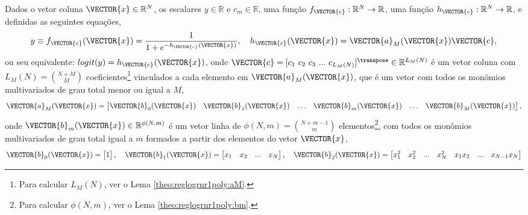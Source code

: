 
\begin{myproofT}\label{proof:theo:reglogrnr1poly}
Dados
o vetor coluna $\VECTOR{x} \in \mathbb{R}^{N}$, os escalares $y \in \mathbb{R}$ e $c_m \in \mathbb{R}$,
uma função $f_{\VECTOR{c}}:\mathbb{R}^{N} \rightarrow \mathbb{R}$, 
uma função $h_{\VECTOR{c}}:\mathbb{R}^{N} \rightarrow \mathbb{R}$,  e 
definidas as seguintes equações,
\begin{equation}\label{eq:proof:theo:reglogrnr1poly:1}
y\equiv f_{\VECTOR{c}}(\VECTOR{x})= \frac{1}{1+e^{-h_{\VECTOR{c}}(\VECTOR{x}) }},
\quad h_{\VECTOR{c}}(\VECTOR{x}) =  \VECTOR{a}_M(\VECTOR{x})\VECTOR{c},
\end{equation}
ou seu equivalente: $logit(y)=h_{\VECTOR{c}}(\VECTOR{x})$,
onde $\VECTOR{c}=[c_1~ c_2~ c_3~  ...~ c_{L_M(N)}]^{\transpose} \in \mathbb{R}^{L_M(N)}$ é um vetor coluna
com $L_M(N)=\binom{N+M}{M}$ coeficientes\footnote{Para calcular $L_M(N)$, ver o Lema \ref{theo:reglogrnr1poly:aM}.} 
vinculados a cada elemento em
$\VECTOR{a}_M(\VECTOR{x})$, que  é um vetor com todos os monômios multivariados de grau total menor ou igual a $M$,
\begin{equation}\label{eq:proof:theo:reglogrnr1poly:2}
\VECTOR{a}_M(\VECTOR{x})=
\begin{bmatrix}
\VECTOR{b}_0(\VECTOR{x}) &
\VECTOR{b}_1(\VECTOR{x}) &
\hdots &
\VECTOR{b}_m(\VECTOR{x}) &
\hdots &
\VECTOR{b}_M(\VECTOR{x}) 
\end{bmatrix},
\end{equation}
onde $\VECTOR{b}_m(\VECTOR{x}) \in \mathbb{R}^{\phi(N,m)}$ é um vetor linha 
de $\phi(N,m)=\binom{N+m-1}{m}$ elementos\footnote{Para calcular $\phi(N,m)$, ver o Lema \ref{theo:reglogrnr1poly:bm}.},
com todos os monômios multivariados de grau total igual a $m$
formados a partir dos elementos do vetor $\VECTOR{x}$,
\begin{equation}\label{eq:proof:theo:reglogrnr1poly:3}
\VECTOR{b}_0(\VECTOR{x})=
\begin{bmatrix}
1 
\end{bmatrix},
\quad 
\VECTOR{b}_1(\VECTOR{x})=
\begin{bmatrix}
x_1 & x_2 & ... &  x_N
\end{bmatrix},
\quad 
\VECTOR{b}_2(\VECTOR{x})=
\begin{bmatrix}
x_1^2 & x_2^2 & ... &  x_N^2 & x_1 x_2 &  ... & x_{N-1} x_N

\end{bmatrix}
\end{equation}
\end{myproofT}
